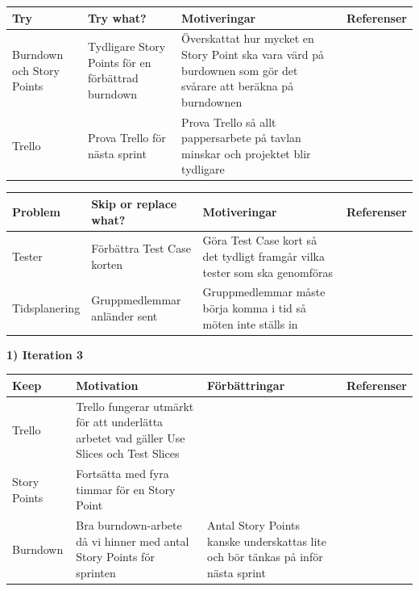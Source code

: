 \documentclass[conference,a4paper]{IEEEtran}
\newcommand\Tstrut{\rule{0pt}{2.6ex}}       %
\newcommand\Bstrut{\rule[-0.9ex]{0pt}{0pt}} %
\newcommand{\TBstrut}{\Tstrut\Bstrut} %
\begin{document}
\begin{table}[H]
	\small
  \centering
	\begin{tabular}{|p{1.5cm}|p{2cm}|p{1.8cm}|p{1.5cm}|} %
    \hline
    Try & Try what? & Motiveringar & Referenser \TBstrut \\
    \hline
    Burndown och Story Points & Tydligare Story Points för en förbättrad burndown & Överskattat hur mycket en Story Point ska vara värd på burdownen som gör det svårare att beräkna på burndownen & \TBstrut \\
    \hline
    Trello & Prova Trello för nästa sprint & Prova Trello så allt pappersarbete på tavlan minskar och projektet blir tydligare & \TBstrut \\
    \hline
  \end{tabular}
\end{table}

\begin{table}[H]
	\small
  \centering
	\begin{tabular}{|p{1.5cm}|p{2cm}|p{1.8cm}|p{1.5cm}|} %
    \hline
    Problem & Skip or replace what? & Motiveringar & Referenser \TBstrut \\
    \hline
    Tester & Förbättra Test Case korten & Göra Test Case kort så det tydligt framgår vilka tester som ska genomföras &\TBstrut \\
    \hline
    Tidsplanering & Gruppmedlemmar anländer sent & Gruppmedlemmar måste börja komma i tid så möten inte ställs in& \TBstrut \\
    \hline
  \end{tabular}
\end{table}

\textbf{1) Iteration 3}

\begin{table}[H]
	\small
  \centering
	\begin{tabular}{|p{1.5cm}|p{2cm}|p{1.8cm}|p{1.5cm}|} %
    \hline
    Keep & Motivation & Förbättringar & Referenser \TBstrut \\
    \hline
    Trello & Trello fungerar utmärkt för att underlätta arbetet vad gäller Use Slices och Test Slices &  &\TBstrut \\
    \hline
    Story Points & Fortsätta med fyra timmar för en Story Point &  & \TBstrut \\
    \hline
    Burndown & Bra burndown-arbete då vi hinner med antal Story Points för sprinten & Antal Story Points kanske underskattas lite och bör tänkas på inför nästa sprint & \TBstrut \\
    \hline
  \end{tabular}
\end{table}
\end{document}
